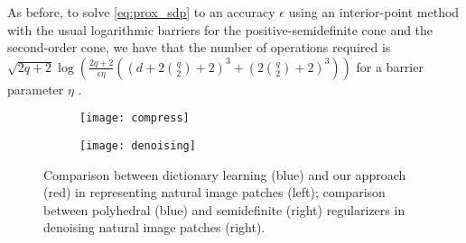 \documentclass[11pt,letterpaper]{article}
\begin{document}
As before, to solve \eqref{eq:prox_sdp} to an accuracy $\epsilon$ using an interior-point method with the usual logarithmic barriers for the positive-semidefinite cone and the second-order cone, we have that the number of operations required is $\sqrt{2q+2} \log\left(\frac{2q+2}{\epsilon \eta}\left((d+2{q \choose 2}+2)^3 + (2{q \choose 2}+2)^3\right) \right)$ for a barrier parameter $\eta$ \cite{Ren:01}.






\begin{figure}
	\centering
	\begin{subfigure}{.5\textwidth}
		\centering
		\texttt{[image: compress]}
		\label{fig:compresscompare}
	\end{subfigure}%
	\begin{subfigure}{.5\textwidth}
		\centering
		\texttt{[image: denoising]}
		\label{fig:denoisingfixrank}
	\end{subfigure}
	\caption{Comparison between dictionary learning (blue) and our approach (red) in representing natural image patches (left); comparison between polyhedral (blue) and semidefinite (right) regularizers in denoising natural image patches (right).}
	\label{fig:representanddenoise}
\end{figure}
\end{document}
